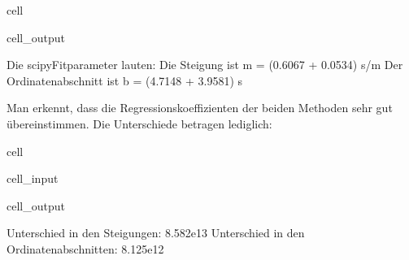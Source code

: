 \documentclass[letterpaper,10pt,english]{jupyterBook}
\begin{document}
\begin{sphinxuseclass}{cell}
\begin{sphinxVerbatimOutput}
\begin{sphinxuseclass}{cell_output}
\begin{sphinxVerbatim}[commandchars=\\\{\}]
Die scipy\PYGZhy{}Fitparameter lauten:
Die Steigung ist 		 m = (0.6067 +\PYGZhy{} 0.0534) s/m
Der Ordinatenabschnitt ist 	 b = (4.7148 +\PYGZhy{} 3.9581) s
\end{sphinxVerbatim}

\noindent{}

\end{sphinxuseclass}\end{sphinxVerbatimOutput}

\end{sphinxuseclass}
\sphinxAtStartPar
Man erkennt, dass die Regressionskoeffizienten der beiden Methoden sehr gut übereinstimmen. Die Unterschiede betragen lediglich:

\begin{sphinxuseclass}{cell}\begin{sphinxVerbatimInput}

\begin{sphinxuseclass}{cell_input}
\begin{sphinxVerbatim}[commandchars=\\\{\}]
 \PYG{p}{[}\PYG{p}{]}\PYG{p}{[}\PYG{p}{]}
 \PYG{p}{[}\PYG{p}{]}\PYG{p}{[}\PYG{p}{]}
\end{sphinxVerbatim}

\end{sphinxuseclass}\end{sphinxVerbatimInput}
\begin{sphinxVerbatimOutput}

\begin{sphinxuseclass}{cell_output}
\begin{sphinxVerbatim}[commandchars=\\\{\}]
Unterschied in den Steigungen: 		  8.582e\PYGZhy{}13
Unterschied in den Ordinatenabschnitten: \PYGZhy{}8.125e\PYGZhy{}12
\end{sphinxVerbatim}

\end{sphinxuseclass}\end{sphinxVerbatimOutput}

\end{sphinxuseclass}
\end{document}
